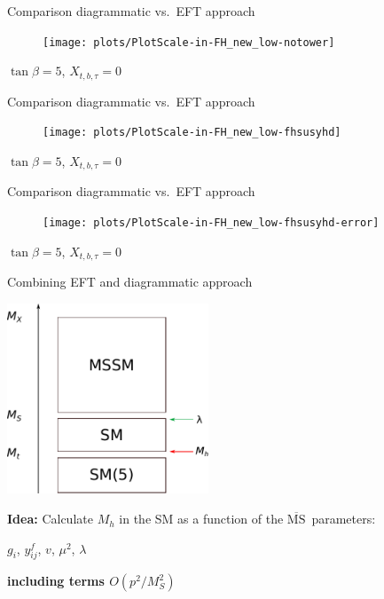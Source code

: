 \documentclass[hyperref={pdfpagelabels=false},ngerman]{beamer}
\renewcommand{\emph}{\textbf}
\newcommand{\MSbar}{\ensuremath{\overline{\text{MS}}}}
\begin{document}
\begin{frame}{Comparison diagrammatic vs.\ EFT approach}
  \begin{figure}
    \centering
    \texttt{[image: plots/PlotScale-in-FH\_new\_low-notower]}
  \end{figure}
  $\tan\beta = 5$, $X_{t,b,\tau} = 0$
\end{frame}

\begin{frame}{Comparison diagrammatic vs.\ EFT approach}
  \begin{figure}
    \centering
    \texttt{[image: plots/PlotScale-in-FH\_new\_low-fhsusyhd]}
  \end{figure}
  $\tan\beta = 5$, $X_{t,b,\tau} = 0$
\end{frame}

\begin{frame}{Comparison diagrammatic vs.\ EFT approach}
  \begin{figure}
    \centering
    \texttt{[image: plots/PlotScale-in-FH\_new\_low-fhsusyhd-error]}
  \end{figure}
  $\tan\beta = 5$, $X_{t,b,\tau} = 0$
\end{frame}


\begin{frame}{Combining EFT and diagrammatic approach}
  \begin{center}
    \includegraphics[width=0.45\textwidth]{images/mssm-sm-tower-eft}\\[1em]
  \end{center}
  \emph{Idea:} Calculate $M_h$ in the SM as a function of the \MSbar\ parameters:\\[1em]
  \begin{center}
    $g_i$, $y^f_{ij}$, $v$, $\mu^2$, $\lambda$
  \end{center}
  \emph{including terms $O(p^2/M_S^2)$}
\end{frame}
\end{document}

